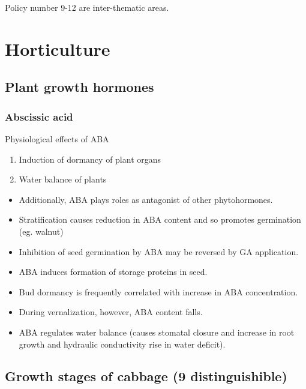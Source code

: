 \documentclass[
]{book}
\providecommand{\tightlist}{%
  \setlength{\itemsep}{0pt}\setlength{\parskip}{0pt}}
\begin{document}
Policy number 9-12 are inter-thematic areas.

\hypertarget{horticulture}{%
\chapter{Horticulture}\label{horticulture}}

\hypertarget{plant-growth-hormones}{%
\section{Plant growth hormones}\label{plant-growth-hormones}}

\hypertarget{abscissic-acid}{%
\subsection{Abscissic acid}\label{abscissic-acid}}

Physiological effects of ABA

\begin{enumerate}
\def\labelenumi{\arabic{enumi}.}
\tightlist
\item
  Induction of dormancy of plant organs
\item
  Water balance of plants
\end{enumerate}

\begin{itemize}
\tightlist
\item
  Additionally, ABA plays roles as antagonist of other phytohormones.
\item
  Stratification causes reduction in ABA content and so promotes germination (eg. walnut)
\item
  Inhibition of seed germination by ABA may be reversed by GA application.
\item
  ABA induces formation of storage proteins in seed.
\item
  Bud dormancy is frequently correlated with increase in ABA concentration.
\item
  During vernalization, however, ABA content falls.
\item
  ABA regulates water balance (causes stomatal closure and increase in root growth and hydraulic conductivity rise in water deficit).
\end{itemize}

\hypertarget{growth-stages-of-cabbage-9-distinguishible}{%
\section{Growth stages of cabbage (9 distinguishible)}\label{growth-stages-of-cabbage-9-distinguishible}}
\end{document}
